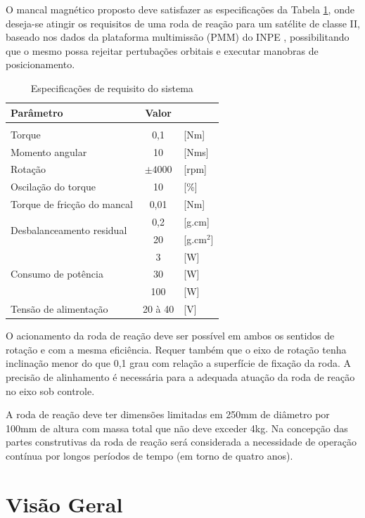 O mancal magnético proposto deve satisfazer as especificações da Tabela \ref{tab:PMM:especificações}, onde deseja-se atingir os requisitos de uma roda de reação para um satélite de classe II, baseado nos dados da plataforma multimissão (PMM) do INPE \citep{Veloso2009}, possibilitando que o mesmo possa rejeitar pertubações orbitais e executar manobras de posicionamento. 

\begin{table}[!ht]
    \centering
    \begin{tabular}{l c l }
		Parâmetro & Valor &   \\
       	\hline \\
 		Torque   						  & 0,1 & [Nm]  \\
 		Momento angular  				  & 10 &      [Nms] \\
 		Rotação 							  & $\pm4000$ & [rpm] \\
 		Oscilação do torque 				  & 10  & [\%] \\
 		Torque de fricção do mancal 		  & 0,01 & [Nm] \\
 		\multirow{2}{*}{Desbalanceamento residual} & 0,2 & [g.cm]\\
 		 & 20  & [g.cm$^{2}$]  \\
 		\multirow{3}{*}{Consumo de potência} 
 		& 3 & [W] 	 \\
 		& 30 & [W] \\
 		& 100 & [W] 	\\	
 		Tensão de alimentação  & 20 à 40 & [V]  \\
    \end{tabular}
    \caption{Especificações de requisito do sistema}
    \label{tab:PMM:especificações}
\end{table}

O acionamento da roda de reação deve ser possível em ambos os sentidos de rotação e com a mesma eficiência. Requer também que o eixo de rotação tenha inclinação menor do que 0,1 grau com relação a superfície de fixação da roda. A precisão de alinhamento é necessária para a adequada atuação da roda de reação no eixo sob controle.

A roda de reação deve ter dimensões limitadas em 250mm de diâmetro por 100mm de altura com massa total que não deve exceder 4kg. Na concepção das partes construtivas da roda de reação será considerada a necessidade de operação contínua por longos períodos de tempo (em torno de quatro anos).

\section{Visão Geral}

